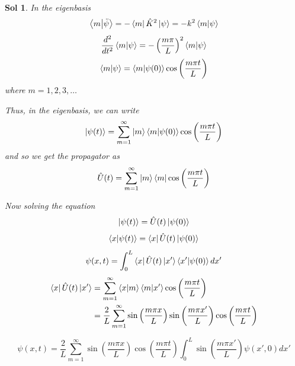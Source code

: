 \documentclass[12pt,a4paper]{report}
\newcommand{\nder}[3]{\frac{d^#3#1}{d#2^#3}}
\newtheorem*{solution}{Sol}
\begin{document}
\begin{solution}
    In the eigenbasis
    \begin{equation*}
        \bra{m}\ket{\ddot{\psi}} = -\bra{m}\hat{K}^2\ket{\psi} = -k^2\bra{m}\ket{\psi}
    \end{equation*}
    \begin{equation*}
        \nder{}{t}{2}\bra{m}\ket{\psi} = -\left(\frac{m\pi}{L}\right)^2\bra{m}\ket{\psi}
    \end{equation*}
    \begin{equation*}
        \bra{m}\ket{\psi} = \bra{m}\ket{\psi(0)}\cos\left( \frac{m\pi t}{L} \right)
    \end{equation*}
    where $m = 1, 2, 3, \dots$

    Thus, in the eigenbasis, we can write
    \begin{equation*}
        \ket{\psi(t)} = \sum_{m=1}^{\infty} \ket{m}\bra{m}\ket{\psi(0)}\cos\left( \frac{m\pi t}{L} \right)
    \end{equation*}
    and so we get the propagator as
    \begin{equation*}
        \hat{U}(t) = \sum_{m=1}^{\infty} \ket{m}\bra{m}\cos\left( \frac{m\pi t}{L} \right)
    \end{equation*}

    Now solving the equation
    \begin{equation*}
        \ket{\psi(t)} = \hat{U}(t)\ket{\psi(0)}
    \end{equation*}
    \begin{equation*}
        \bra{x}\ket{\psi(t)} = \bra{x}\hat{U}(t)\ket{\psi(0)}
    \end{equation*}
    \begin{equation*}
        \psi(x, t) = \int_{0}^{L}\bra{x}\hat{U}(t)\ket{x'}\bra{x'}\ket{\psi(0)}dx'
    \end{equation*}
    \begin{align*}
        \bra{x}\hat{U}(t)\ket{x'} &= \sum_{m=1}^{\infty} \bra{x}\ket{m}\bra{m}\ket{x'}\cos\left( \frac{m\pi t}{L} \right) \\
        &= \frac{2}{L}\sum_{m=1}^{\infty} \sin\left( \frac{m\pi x}{L} \right)\sin\left( \frac{m\pi x'}{L} \right)\cos\left( \frac{m\pi t}{L} \right)
    \end{align*}

    \begin{equation*}
        \psi(x, t) = \frac{2}{L}\sum_{m=1}^{\infty}\sin\left( \frac{m\pi x}{L} \right)\cos\left( \frac{m\pi t}{L} \right)\int_{0}^{L} \sin\left( \frac{m\pi x'}{L} \right)\psi(x', 0)dx'
    \end{equation*}


\end{solution}
\end{document}
